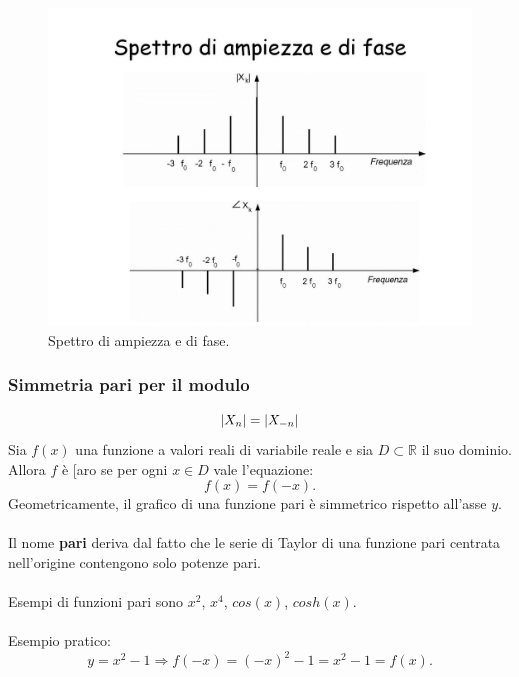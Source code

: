 \documentclass[12pt,oneside,openany]{memoir}
\numberwithin{equation}{subsection}
\DeclarePairedDelimiter{\abs}{\lvert}{\rvert}
\begin{document}
\begin{figure}
	\centering
	\captionsetup{justification=centering}
	\includegraphics[width=1.0\textwidth]{images/spettro_di_ampiezza_e_di_fase.jpg}
	\caption{Spettro di ampiezza e di fase.}
\end{figure}


\subsubsection{Simmetria pari per il modulo}
\begin{equation}
	\abs{X_n} = \abs{X_{-n}}
\end{equation}
Sia $f(x)$ una funzione a valori reali di variabile reale e sia $D \subset
\mathbb{R}$ il suo dominio. Allora $f$ \`e [aro se per ogni $x \in D$ vale
l'equazione:
\[
	f(x) = f(-x).
\]
Geometricamente, il grafico di una funzione pari \`e simmetrico rispetto
all'asse $y$.\\
\\
Il nome \textbf{pari} deriva dal fatto che le serie di Taylor di una funzione
pari centrata nell'origine contengono solo potenze pari.\\
\\
Esempi di funzioni pari sono $x^2$, $x^4$, $cos(x)$, $cosh(x)$.\\
\\
Esempio pratico:
\[
	y = x^2 - 1 \Longrightarrow f(-x) = (-x)^2 - 1 = x^2 - 1 = f(x).
\]
\end{document}
